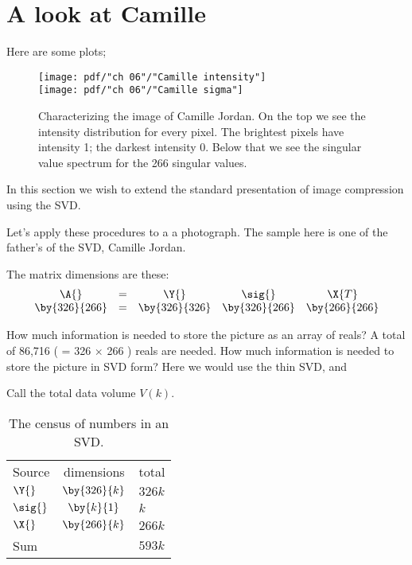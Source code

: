 \section{A look at Camille}
Here are some plots;

\begin{figure}[htbp] %
   \centering
   \texttt{[image: pdf/"ch 06"/"Camille intensity"]} \\[25pt]
   \texttt{[image: pdf/"ch 06"/"Camille sigma"]} 
   \caption[Characterizing the image]{Characterizing the image of Camille Jordan. On the top we see the intensity distribution for every pixel. The brightest pixels have intensity 1; the darkest intensity 0. Below that we see the singular value spectrum for the 266 singular values. }
   \label{fig:CamilleCharacterization}
\end{figure}

In this section we wish to extend the standard presentation of image compression using the SVD.

Let's apply these procedures to a a photograph. The sample here is one of the father's of the SVD, Camille Jordan.

The matrix dimensions are these:
\begin{equation}
  \begin{array}{ccccc}
    \A{}          & = & \Y{} & \sig{} & \X{T} \\
    \by{326}{266} & = & \by{326}{326} & \by{326}{266} & \by{266}{266}
  \end{array}
\end{equation}

How much information is needed to store the picture as an array of reals? A total of 86,716 ( = 326 $\times$ 266 ) reals are needed.
How much information is needed to store the picture in SVD form? Here we would use the thin SVD, and

Call the total data volume $V(k)$.
\begin{table}[htdp]
\begin{center}
\begin{tabular}{lcl}
Source & dimensions & total \\
$\Y{}$ & $\by{326}{k}$ & $326k$\\
$\sig{}$ & $\by{k}{1}$ & $k$\\
$\X{}$ & $\by{266}{k}$ & $266k$\\\hline
Sum && $593k$
\end{tabular}
\end{center}
\label{tab:jordan:reals}
\caption[The census of numbers in an SVD]{The census of numbers in an SVD.}
\end{table}%


